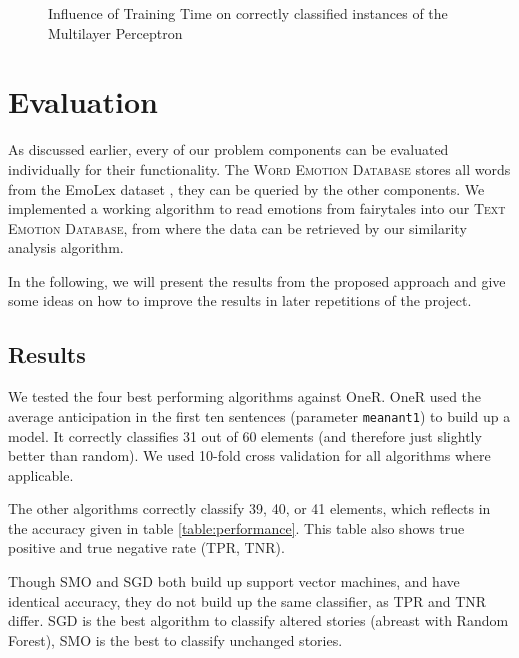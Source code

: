 \documentclass[letterpaper]{article}
\begin{document}
\begin{figure}[thpb]
      \centering
      \caption{Influence of Training Time on correctly classified instances of the Multilayer Perceptron}
      \label{figure:MLP}
\end{figure}



\section{Evaluation}
As discussed earlier, every of our problem components can be evaluated individually for their functionality. The \textsc{Word Emotion Database} stores all words from the EmoLex dataset \cite{Mohammad}, they can be queried by the other components. We implemented a working algorithm to read emotions from fairytales into our \textsc{Text Emotion Database}, from where the data can be retrieved by our similarity analysis algorithm. 

In the following, we will present the results from the proposed approach and give some ideas on how to improve the results in later repetitions of the project. 
\subsection{Results}

We tested the four best performing algorithms against OneR. OneR used the average anticipation in the first ten sentences (parameter \texttt{meanant1}) to build up a model. It correctly classifies 31 out of 60 elements (and therefore just slightly better than random). We used 10-fold cross validation for all algorithms where applicable.

The other algorithms correctly classify 39, 40, or 41 elements, which reflects in the accuracy given in table \ref{table:performance}. This table also shows true positive and true negative rate (TPR, TNR). 

Though SMO and SGD both build up support vector machines, and have identical accuracy, they do not build up the same classifier, as TPR and TNR differ. SGD is the best algorithm to classify altered stories (abreast with Random Forest), SMO is the best to classify unchanged stories. 
\end{document}
